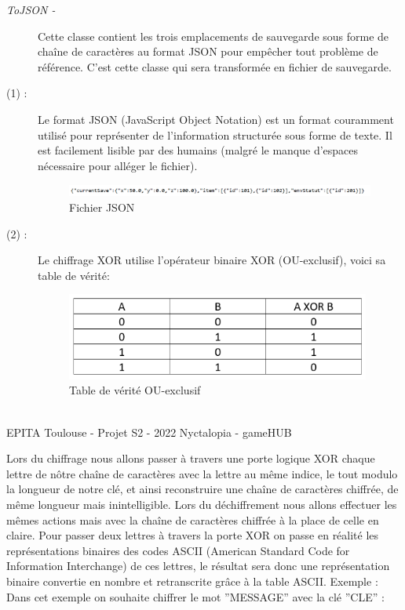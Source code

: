   \begin{description}
 \item[\emph{ToJSON -}] Cette classe contient les trois emplacements de sauvegarde sous forme de chaîne de caractères au format JSON pour empêcher tout problème de référence.
 C'est cette classe qui sera transformée en fichier de sauvegarde.
\end{description}

\begin{description}
    \item[(1) :] Le format JSON (JavaScript Object Notation) est un format couramment utilisé pour représenter de l’information structurée sous forme de texte. Il est facilement lisible par des humains (malgré le manque d’espaces nécessaire pour alléger le fichier).
    \begin{figure}[H]
        \centering
        \includegraphics[width=18cm]{img/gameplay/JSONRaw.PNG}
        \caption{ Fichier JSON}
        \label{fig:JSONraw}
    \end{figure}
    
    \item[(2) :] Le chiffrage XOR utilise l’opérateur binaire XOR (OU-exclusif), voici sa table de vérité:
    \newline
    \begin{figure}[H]
        \centering
        \includegraphics[width=10cm]{img/gameplay/XORtable.PNG}
        \caption{ Table de vérité OU-exclusif}
        \label{fig:XORtable}
    \end{figure}
\end{description}
\par

    
    
\vfill
\noindent\makebox[\linewidth]{\rule{.8\paperwidth}{.6pt}}\\[0.2cm]
EPITA Toulouse - Projet S2 - 2022 \hfill Nyctalopia - gameHUB
\noindent\makebox[\linewidth]{\rule{.8\paperwidth}{.6pt}}
\newpage

Lors du chiffrage nous allons passer à travers une porte logique XOR chaque lettre de nôtre chaîne de caractères avec la lettre au même indice, le tout modulo la longueur de notre clé, et ainsi reconstruire une chaîne de caractères chiffrée, de même longueur mais inintelligible.
Lors du déchiffrement nous allons effectuer les mêmes actions mais avec la chaîne de caractères chiffrée à la place de celle en claire.
Pour passer deux lettres à travers la porte XOR on passe en réalité les représentations binaires des codes ASCII (American Standard Code for Information Interchange) de ces lettres, le résultat sera donc une représentation binaire convertie en nombre et retranscrite grâce à la table ASCII.
Exemple : 
Dans cet exemple on souhaite chiffrer le mot ''MESSAGE'' avec la clé ''CLE'' :

